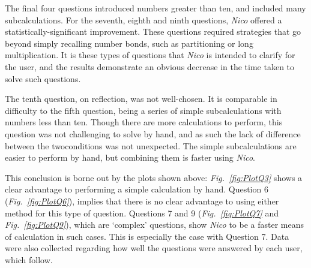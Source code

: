 \documentclass[12pt,twoside,notitlepage,xetex]{report}
\begin{document}
The final four questions introduced numbers greater than ten, and included many subcalculations.  For the seventh, eighth and ninth questions, \emph{Nico} offered a statistically-significant improvement.  These questions required strategies that go beyond simply recalling number bonds, such as partitioning or long multiplication.  It is these types of questions that \emph{Nico} is intended to clarify for the user, and the results demonstrate an obvious decrease in the time taken to solve such questions.

The tenth question, on reflection, was not well-chosen.  It is comparable in difficulty to the fifth question, being a series of simple subcalculations with numbers less than ten.  Though there are more calculations to perform,  this question was not challenging to solve by hand, and as such the lack of difference between the twoconditions was not unexpected.  The simple subcalculations are easier to perform by hand, but combining them is faster using \emph{Nico}.

This conclusion is borne out by the plots shown above: \emph{Fig.~\ref{fig:PlotQ3}} shows a clear advantage to performing a simple calculation by hand.  Question 6 (\emph{Fig.~\ref{fig:PlotQ6}}), implies that there is no clear advantage to using either method for this type of question.  Questions 7 and 9 (\emph{Fig.~\ref{fig:PlotQ7}} and \emph{Fig.~\ref{fig:PlotQ9}}), which are `complex' questions, show \emph{Nico} to be a faster means of calculation in such cases.  This is especially the case with Question 7.  Data were also collected regarding how well the questions were answered by each user, which follow.
\end{document}
